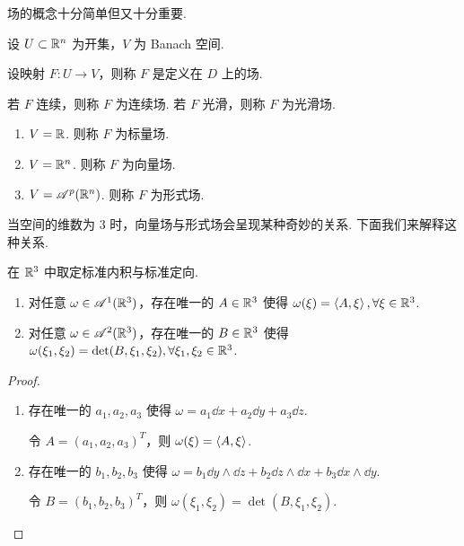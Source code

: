 
场的概念十分简单但又十分重要.

\begin{definition}
    设 $U\subset\mathbb{R}^n$ 为开集，$V$ 为 Banach 空间.

    设映射 $F:U\to V$，则称 $F$ 是定义在 $D$ 上的场.

    若 $F$ 连续，则称 $F$ 为连续场. 若 $F$ 光滑，则称 $F$ 为光滑场.

    \begin{enumerate}
        \item $V=\mathbb{R}$. 则称 $F$ 为标量场.
        
        \item $V=\mathbb{R}^n$. 则称 $F$ 为向量场.
        
        \item $V=\mathscr{A}^p(\mathbb{R}^n)$. 则称 $F$ 为形式场.
    \end{enumerate}
\end{definition}


当空间的维数为 $3$ 时，向量场与形式场会呈现某种奇妙的关系. 下面我们来解释这种关系.


\begin{property}
    在 $\mathbb{R}^3$ 中取定标准内积与标准定向.

    \begin{enumerate}
        \item 对任意 $\omega\in\mathscr{A}^1(\mathbb{R}^3)$，存在唯一的 $A\in\mathbb{R}^3$ 使得 $\omega(\xi)=\left\langle{A,\xi}\right\rangle,\forall\xi\in\mathbb{R}^3$.
        
        \item 对任意 $\omega\in\mathscr{A}^2(\mathbb{R}^3)$，存在唯一的 $B\in\mathbb{R}^3$ 使得 $\omega(\xi_1,\xi_2)=\det(B,\xi_1,\xi_2),\forall\xi_1,\xi_2\in\mathbb{R}^3$.
    \end{enumerate}
\end{property}
\begin{proof}
    \begin{enumerate}
        \item 存在唯一的 $a_1,a_2,a_3$ 使得 $\omega=a_1\dd x+a_2\dd y+a_3\dd z$.
        
        令 $A=(a_1,a_2,a_3)^T$，则 $\omega(\xi)=\left\langle{A,\xi}\right\rangle$.
        
        \item 存在唯一的 $b_1,b_2,b_3$ 使得 $\omega=b_1\dd y\wedge\dd z+b_2\dd z\wedge\dd x+b_3\dd x\wedge\dd y$.
        
        令 $B=(b_1,b_2,b_3)^T$，则 $\omega(\xi_1,\xi_2)=\det(B,\xi_1,\xi_2)$.
    \end{enumerate}
\end{proof}

